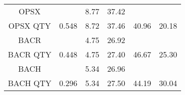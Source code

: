\documentclass[fleqn,10pt,lineno]{manuscript}
\begin{document}
\begin{table}[h]
\begin{tabular}{cccccc}
		\midrule
		OPSX     &                 & 8.77 & 37.42    &                   &                        \\
		OPSX QTY & 0.548           & 8.72 & 37.46    & 40.96             & 20.18                  \\
		\midrule
		BACR     &                 & 4.75 & 26.92    &                   &                        \\
		BACR QTY & 0.448           & 4.75 & 27.40    & 46.67             & 25.30                  \\
		\midrule
		BACH     &                 & 5.34 & 26.96    &                   &                        \\
		BACH QTY & 0.296           & 5.34 & 27.50    & 44.19             & 30.04                  \\
		\bottomrule
	\end{tabular}
\end{table}
\end{document}
